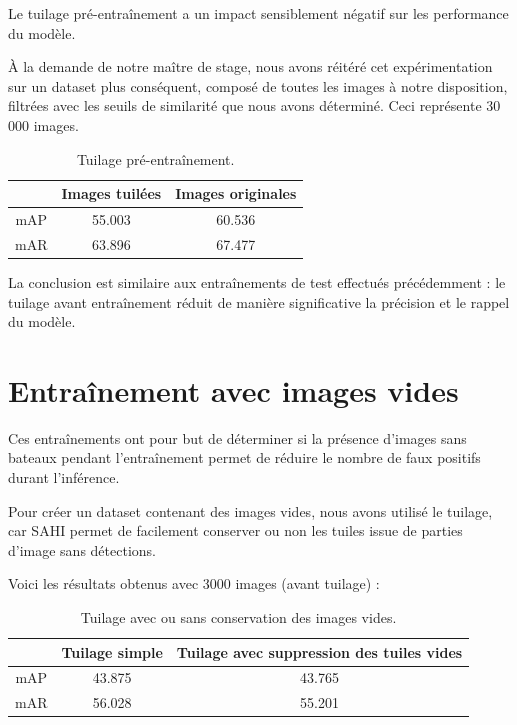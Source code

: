 Le tuilage pré-entraînement a un impact sensiblement négatif sur les performance du modèle.

À la demande de notre maître de stage, nous avons réitéré cet expérimentation sur un
dataset plus conséquent, composé de toutes les images à notre disposition, filtrées 
avec les seuils de similarité que nous avons déterminé. Ceci représente 
30 000 images. 

\begin{table}[h]
    \begin{center}
        \begin{tabular}{c c c}
            \hline
            & Images tuilées & Images originales \\
            \hline
            mAP & 55.003 & 60.536 \\
            mAR & 63.896 & 67.477 \\
        \end{tabular}
    \end{center}
    \caption{Tuilage pré-entraînement.}
\end{table}

La conclusion est similaire aux entraînements de test effectués précédemment : 
le tuilage avant entraînement réduit de manière significative la précision et 
le rappel du modèle. 

\section{Entraînement avec images vides}

Ces entraînements ont pour but de déterminer si la présence d'images sans bateaux pendant l'entraînement 
permet de réduire le nombre de faux positifs durant l'inférence. 

Pour créer un dataset contenant des images vides, nous avons utilisé le tuilage, car SAHI permet 
de facilement conserver ou non les tuiles issue de parties d'image sans détections. 

Voici les résultats obtenus avec 3000 images (avant tuilage) : \\

\begin{table}[h]
    \begin{center}
        \begin{tabular}{c c c}
            \hline
            & Tuilage simple & Tuilage avec suppression des tuiles vides \\
            \hline
            mAP & 43.875 & 43.765 \\
            mAR & 56.028 & 55.201 \\
        \end{tabular}
    \end{center}
    \caption{Tuilage avec ou sans conservation des images vides.}
\end{table}

